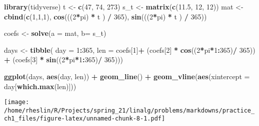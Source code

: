 \documentclass[]{article}
\newenvironment{Shaded}{\begin{snugshade}}{\end{snugshade}}
\newcommand{\DataTypeTok}[1]{\textcolor[rgb]{0.13,0.29,0.53}{#1}}
\newcommand{\DecValTok}[1]{\textcolor[rgb]{0.00,0.00,0.81}{#1}}
\newcommand{\FloatTok}[1]{\textcolor[rgb]{0.00,0.00,0.81}{#1}}
\newcommand{\KeywordTok}[1]{\textcolor[rgb]{0.13,0.29,0.53}{\textbf{#1}}}
\newcommand{\NormalTok}[1]{#1}
\newcommand{\OperatorTok}[1]{\textcolor[rgb]{0.81,0.36,0.00}{\textbf{#1}}}
\newcommand{\StringTok}[1]{\textcolor[rgb]{0.31,0.60,0.02}{#1}}
\begin{document}
\begin{Shaded}
\begin{Highlighting}[]
\KeywordTok{library}\NormalTok{(tidyverse)}
\NormalTok{t <-}\StringTok{ }\KeywordTok{c}\NormalTok{(}\DecValTok{47}\NormalTok{, }\DecValTok{74}\NormalTok{, }\DecValTok{273}\NormalTok{)}
\NormalTok{s_t <-}\StringTok{ }\KeywordTok{matrix}\NormalTok{(}\KeywordTok{c}\NormalTok{(}\FloatTok{11.5}\NormalTok{, }\DecValTok{12}\NormalTok{, }\DecValTok{12}\NormalTok{))}
\NormalTok{mat <-}\StringTok{ }\KeywordTok{cbind}\NormalTok{(}\KeywordTok{c}\NormalTok{(}\DecValTok{1}\NormalTok{,}\DecValTok{1}\NormalTok{,}\DecValTok{1}\NormalTok{), }
             \KeywordTok{cos}\NormalTok{(((}\DecValTok{2}\OperatorTok{*}\NormalTok{pi) }\OperatorTok{*}\StringTok{ }\NormalTok{t ) }\OperatorTok{/}\StringTok{ }\DecValTok{365}\NormalTok{),}
             \KeywordTok{sin}\NormalTok{(((}\DecValTok{2}\OperatorTok{*}\NormalTok{pi) }\OperatorTok{*}\StringTok{ }\NormalTok{t ) }\OperatorTok{/}\StringTok{ }\DecValTok{365}\NormalTok{))}

\NormalTok{coefs <-}\StringTok{ }\KeywordTok{solve}\NormalTok{(}\DataTypeTok{a =}\NormalTok{ mat, }\DataTypeTok{b=}\NormalTok{ s_t)}


\NormalTok{days <-}\StringTok{ }\KeywordTok{tibble}\NormalTok{( }\DataTypeTok{day =} \DecValTok{1}\OperatorTok{:}\DecValTok{365}\NormalTok{, }\DataTypeTok{len =}\NormalTok{ coefs[}\DecValTok{1}\NormalTok{]}\OperatorTok{+}\StringTok{ }\NormalTok{(coefs[}\DecValTok{2}\NormalTok{] }\OperatorTok{*}\StringTok{ }\KeywordTok{cos}\NormalTok{((}\DecValTok{2}\OperatorTok{*}\NormalTok{pi}\OperatorTok{*}\DecValTok{1}\OperatorTok{:}\DecValTok{365}\NormalTok{)}\OperatorTok{/}\StringTok{ }\DecValTok{365}\NormalTok{)) }\OperatorTok{+}\StringTok{ }\NormalTok{(coefs[}\DecValTok{3}\NormalTok{] }\OperatorTok{*}\StringTok{ }\KeywordTok{sin}\NormalTok{((}\DecValTok{2}\OperatorTok{*}\NormalTok{pi}\OperatorTok{*}\DecValTok{1}\OperatorTok{:}\DecValTok{365}\NormalTok{)}\OperatorTok{/}\StringTok{ }\DecValTok{365}\NormalTok{)))}

\KeywordTok{ggplot}\NormalTok{(days, }\KeywordTok{aes}\NormalTok{(day, len)) }\OperatorTok{+}
\StringTok{  }\KeywordTok{geom_line}\NormalTok{() }\OperatorTok{+}
\StringTok{  }\KeywordTok{geom_vline}\NormalTok{(}\KeywordTok{aes}\NormalTok{(}\DataTypeTok{xintercept =}\NormalTok{ day[}\KeywordTok{which.max}\NormalTok{(len)]))}
\end{Highlighting}
\end{Shaded}

\texttt{[image: /home/rheslin/R/Projects/spring\_21/linalg/problems/markdowns/practice\_ch1\_files/figure-latex/unnamed-chunk-8-1.pdf]}
\end{document}
